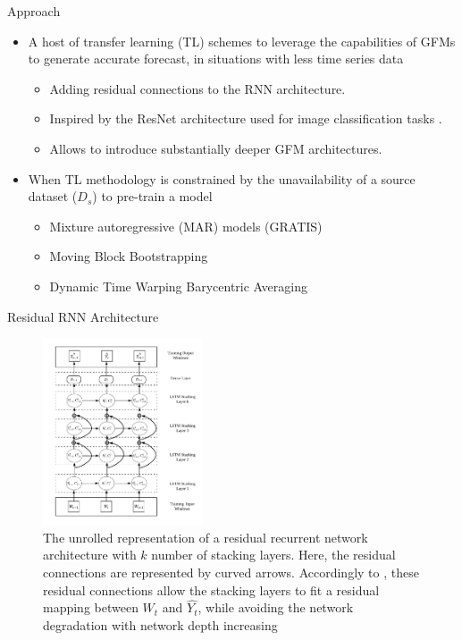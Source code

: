 \documentclass{beamer}
\begin{document}
\begin{frame}{Approach}
   \begin{itemize}
	\item A host of transfer learning (TL) schemes to leverage the capabilities of GFMs to generate accurate forecast, in situations with less time series data
	\vspace{1mm}
		\begin{itemize}
		\item \color{blue} Adding residual connections to the RNN architecture.
		\item \color{blue} Inspired by the ResNet architecture used for image classification tasks \cite{He2016-wm}.
		\item \color{blue} Allows to introduce substantially deeper GFM architectures.
 		\end{itemize}
 		\vspace{2mm}
 	\item When TL methodology is constrained by the unavailability of a source dataset ($D_s$) to pre-train a model
 	\begin{itemize}
		\item \color{blue} Mixture autoregressive (MAR) models (GRATIS)~\cite{Kang2019-dy}
		\item \color{blue} Moving Block Bootstrapping~\cite{Bergmeir2016-zk}
		\item \color{blue} Dynamic Time Warping Barycentric Averaging~\cite{Forestier2017-su}
 		\end{itemize}
\end{itemize}
\end{frame}

\begin{frame}{Residual RNN Architecture}
   \begin{figure}[htbp]
\centerline{\includegraphics[width=0.42\textwidth]{images/resnetarch}}
\caption{ \tiny The unrolled representation of a residual recurrent network architecture with $k$ number of stacking layers. Here, the residual connections are represented by curved arrows. Accordingly to \cite{He2016-wm}, these residual connections allow the stacking layers to fit a residual mapping between $W_t$ and $\hat{Y_{t}}$, while avoiding the network degradation with network depth increasing}
\label{forecastingarch}
\end{figure}
\end{frame}
\end{document}
